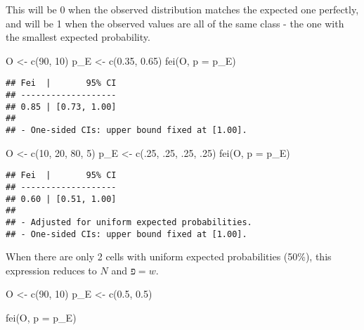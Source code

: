 \documentclass[
]{article}
\newenvironment{Shaded}{\begin{snugshade}}{\end{snugshade}}
\newcommand{\AttributeTok}[1]{\textcolor[rgb]{0.77,0.63,0.00}{#1}}
\newcommand{\DecValTok}[1]{\textcolor[rgb]{0.00,0.00,0.81}{#1}}
\newcommand{\FloatTok}[1]{\textcolor[rgb]{0.00,0.00,0.81}{#1}}
\newcommand{\FunctionTok}[1]{\textcolor[rgb]{0.00,0.00,0.00}{#1}}
\newcommand{\NormalTok}[1]{#1}
\newcommand{\OtherTok}[1]{\textcolor[rgb]{0.56,0.35,0.01}{#1}}
\begin{document}
This will be 0 when the observed distribution matches the expected one
perfectly, and will be 1 when the observed values are all of the same
class - the one with the smallest expected probability.

\begin{Shaded}
\begin{Highlighting}[]
\NormalTok{O }\OtherTok{\textless{}{-}} \FunctionTok{c}\NormalTok{(}\DecValTok{90}\NormalTok{, }\DecValTok{10}\NormalTok{)}
\NormalTok{p\_E }\OtherTok{\textless{}{-}} \FunctionTok{c}\NormalTok{(}\FloatTok{0.35}\NormalTok{, }\FloatTok{0.65}\NormalTok{)}
\FunctionTok{fei}\NormalTok{(O, }\AttributeTok{p =}\NormalTok{ p\_E)}
\end{Highlighting}
\end{Shaded}

\begin{verbatim}
## Fei  |       95% CI
## -------------------
## 0.85 | [0.73, 1.00]
## 
## - One-sided CIs: upper bound fixed at [1.00].
\end{verbatim}

\begin{Shaded}
\begin{Highlighting}[]
\NormalTok{O }\OtherTok{\textless{}{-}} \FunctionTok{c}\NormalTok{(}\DecValTok{10}\NormalTok{, }\DecValTok{20}\NormalTok{, }\DecValTok{80}\NormalTok{, }\DecValTok{5}\NormalTok{)}
\NormalTok{p\_E }\OtherTok{\textless{}{-}} \FunctionTok{c}\NormalTok{(.}\DecValTok{25}\NormalTok{, .}\DecValTok{25}\NormalTok{, .}\DecValTok{25}\NormalTok{, .}\DecValTok{25}\NormalTok{)}
\FunctionTok{fei}\NormalTok{(O, }\AttributeTok{p =}\NormalTok{ p\_E)}
\end{Highlighting}
\end{Shaded}

\begin{verbatim}
## Fei  |       95% CI
## -------------------
## 0.60 | [0.51, 1.00]
## 
## - Adjusted for uniform expected probabilities.
## - One-sided CIs: upper bound fixed at [1.00].
\end{verbatim}

When there are only 2 cells with uniform expected probabilities (50\%),
this expression reduces to \(N\) and \(פ = w\).

\begin{Shaded}
\begin{Highlighting}[]
\NormalTok{O }\OtherTok{\textless{}{-}} \FunctionTok{c}\NormalTok{(}\DecValTok{90}\NormalTok{, }\DecValTok{10}\NormalTok{)}
\NormalTok{p\_E }\OtherTok{\textless{}{-}} \FunctionTok{c}\NormalTok{(}\FloatTok{0.5}\NormalTok{, }\FloatTok{0.5}\NormalTok{)}

\FunctionTok{fei}\NormalTok{(O, }\AttributeTok{p =}\NormalTok{ p\_E)}
\end{Highlighting}
\end{Shaded}
\end{document}
